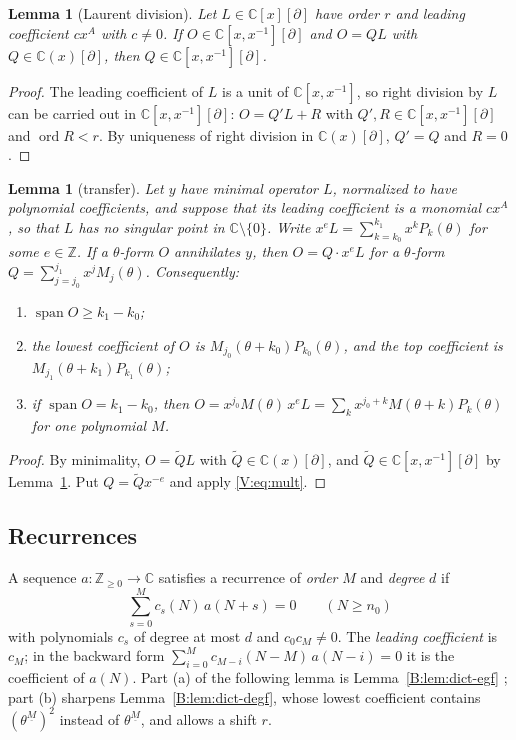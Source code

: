 \documentclass[11pt,a4paper]{article}
\newtheorem{lemma}[theorem]{Lemma}
\theoremstyle{definition}
\theoremstyle{remark}
\newcommand{\C}{\mathbb C}
\newcommand{\Z}{\mathbb Z}
\newcommand{\ff}[2]{#1^{\underline{#2}}}
\DeclareMathOperator{\ord}{ord}
\numberwithin{equation}{section}
\begin{document}
\begin{lemma}[Laurent division]\label{V:lem:laurent}
Let $L\in\C[x][\partial]$ have order $r$ and leading coefficient $cx^A$ with $c\ne0$. If $O\in\C[x,x^{-1}][\partial]$ and $O=QL$ with $Q\in\C(x)[\partial]$, then $Q\in\C[x,x^{-1}][\partial]$.
\end{lemma}

\begin{proof}
The leading coefficient of $L$ is a unit of $\C[x,x^{-1}]$, so right division by $L$ can be carried out in $\C[x,x^{-1}][\partial]$: $O=Q'L+R$ with $Q',R\in\C[x,x^{-1}][\partial]$ and $\ord R<r$. By uniqueness of right division in $\C(x)[\partial]$, $Q'=Q$ and $R=0$.
\end{proof}

\begin{lemma}[transfer]\label{V:lem:transfer}
Let $y$ have minimal operator $L$, normalized to have polynomial coefficients, and suppose that its leading coefficient is a monomial $cx^A$, so that $L$ has no singular point in $\C\setminus\{0\}$. Write $x^eL=\sum_{k=k_0}^{k_1}x^kP_k(\theta)$ for some $e\in\Z$. If a $\theta$-form $O$ annihilates $y$, then $O=Q\cdot x^eL$ for a $\theta$-form $Q=\sum_{j=j_0}^{j_1}x^jM_j(\theta)$. Consequently:
\begin{enumerate}
\item[(a)] $\operatorname{span}O\ge k_1-k_0$;
\item[(b)] the lowest coefficient of $O$ is $M_{j_0}(\theta+k_0)P_{k_0}(\theta)$, and the top coefficient is $M_{j_1}(\theta+k_1)P_{k_1}(\theta)$;
\item[(c)] if $\operatorname{span}O=k_1-k_0$, then $O=x^{j_0}M(\theta)\,x^eL=\sum_kx^{j_0+k}M(\theta+k)P_k(\theta)$ for one polynomial $M$.
\end{enumerate}
\end{lemma}

\begin{proof}
By minimality, $O=\tilde QL$ with $\tilde Q\in\C(x)[\partial]$, and $\tilde Q\in\C[x,x^{-1}][\partial]$ by Lemma~\ref{V:lem:laurent}. Put $Q=\tilde Qx^{-e}$ and apply \eqref{V:eq:mult}.
\end{proof}

\subsection{Recurrences}
A sequence $a:\Z_{\ge0}\to\C$ satisfies a recurrence of \emph{order} $M$ and \emph{degree} $d$ if
\begin{equation}\label{V:eq:rec}
\sum_{s=0}^{M}c_s(N)\,a(N+s)=0\qquad(N\ge n_0)
\end{equation}
with polynomials $c_s$ of degree at most $d$ and $c_0c_M\ne0$. The \emph{leading coefficient} is $c_M$; in the backward form $\sum_{i=0}^{M}c_{M-i}(N-M)\,a(N-i)=0$ it is the coefficient of $a(N)$. Part (a) of the following lemma is Lemma~\ref{B:lem:dict-egf} ; part (b) sharpens Lemma~\ref{B:lem:dict-degf}, whose lowest coefficient contains $(\ff\theta M)^2$ instead of $\ff\theta M$, and allows a shift $r$.
\end{document}

